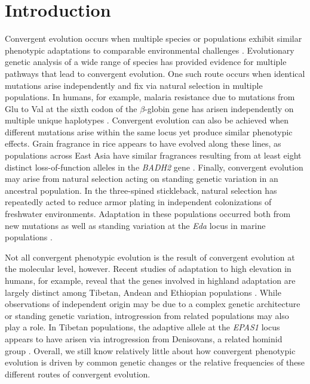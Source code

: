 \section*{Introduction}
\noindent Convergent evolution occurs when multiple species or populations exhibit similar phenotypic adaptations to comparable environmental challenges \cite[]{Wood_2005_15881688,Arendt_2008_18022278,Elmer_2011_21459472}.
Evolutionary genetic analysis of a wide range of species has 
provided evidence for multiple pathways that lead to convergent evolution. 
One such route occurs when identical mutations arise independently and fix via natural selection in multiple populations. 
In humans, for example, malaria resistance due to mutations from Glu to Val at the sixth codon of the $\beta$-globin gene has arisen independently on multiple unique haplotypes  \cite[]{Currat_2002_11741197,Kwiatkowski_2005_16001361}.  
Convergent evolution can also be achieved when different mutations arise within the same locus yet produce similar phenotypic effects.  
Grain fragrance in rice appears to have evolved along these lines, as populations across East Asia have similar fragrances resulting from at least eight distinct loss-of-function alleles in the  \emph{BADH2} gene \cite[]{Kovach_2009_19706531}.  
Finally, convergent evolution may arise from natural selection acting on standing genetic variation in an ancestral population.  
In the three-spined stickleback, natural selection has repeatedly acted to reduce armor plating in independent colonizations of freshwater environments.  
Adaptation in these populations occurred both from new mutations as well as standing variation at the \emph{Eda} locus in marine populations \cite[]{Colosimo_2005_15790847}.  

Not all convergent phenotypic evolution is the result of convergent evolution at the molecular level, however.  
Recent studies of adaptation to high elevation in humans, for example, reveal that the genes involved in highland adaptation are largely distinct among Tibetan, Andean and Ethiopian populations \cite[]{Bigham_2010_20838600,Scheinfeldt_2012_22264333,Alkorta-Aranburu_2012_23236293}. 
While observations of independent origin may be due to a complex genetic architecture or standing genetic variation, introgression from related populations may also play a role.  
In Tibetan populations, the adaptive allele at the \emph{EPAS1} locus appears to have arisen via introgression from Denisovans, a related hominid group \cite[]{huerta2014altitude}.
Overall, we still know relatively little about how convergent phenotypic evolution is driven by common genetic changes or the relative frequencies of these different routes of convergent evolution.

